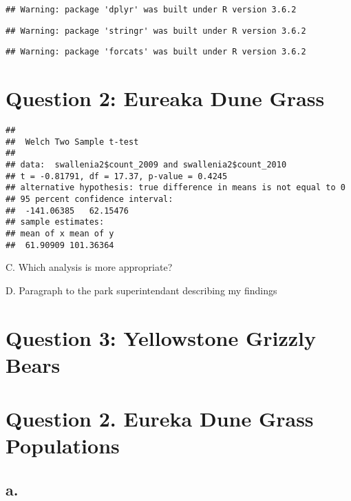 \documentclass[
]{article}
\begin{document}
\begin{verbatim}
## Warning: package 'dplyr' was built under R version 3.6.2
\end{verbatim}

\begin{verbatim}
## Warning: package 'stringr' was built under R version 3.6.2
\end{verbatim}

\begin{verbatim}
## Warning: package 'forcats' was built under R version 3.6.2
\end{verbatim}

\hypertarget{question-2-eureaka-dune-grass}{%
\section{Question 2: Eureaka Dune
Grass}\label{question-2-eureaka-dune-grass}}

\begin{verbatim}
## 
##  Welch Two Sample t-test
## 
## data:  swallenia2$count_2009 and swallenia2$count_2010
## t = -0.81791, df = 17.37, p-value = 0.4245
## alternative hypothesis: true difference in means is not equal to 0
## 95 percent confidence interval:
##  -141.06385   62.15476
## sample estimates:
## mean of x mean of y 
##  61.90909 101.36364
\end{verbatim}

C. Which analysis is more appropriate?

D. Paragraph to the park superintendant describing my findings

\hypertarget{question-3-yellowstone-grizzly-bears}{%
\section{Question 3: Yellowstone Grizzly
Bears}\label{question-3-yellowstone-grizzly-bears}}

\hypertarget{question-2.-eureka-dune-grass-populations}{%
\section{Question 2. Eureka Dune Grass
Populations}\label{question-2.-eureka-dune-grass-populations}}

\hypertarget{a.}{%
\subsection{a.}\label{a.}}
\end{document}
